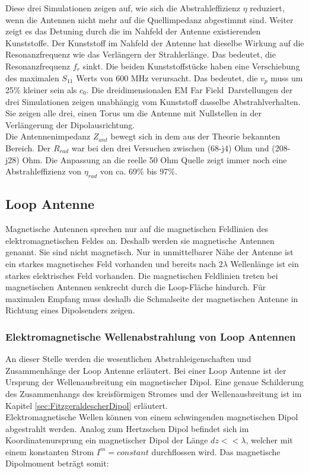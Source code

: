 Diese drei Simulationen zeigen auf, wie sich die Abstrahleffizienz $\eta$ reduziert, wenn die Antennen nicht mehr auf die Quellimpedanz abgestimmt sind. Weiter zeigt es das Detuning durch die im Nahfeld der Antenne existierenden Kunststoffe. Der Kunststoff im Nahfeld der Antenne hat dieselbe Wirkung auf die Resonanzfrequenz wie das Verlängern der  Strahlerlänge. Das bedeutet, die Resonanzfrequenz $f_{r}$ sinkt.  Die beiden Kunststoffstücke haben eine Verschiebung des maximalen $S_{11}$ Werts von 600 MHz verursacht. Das bedeutet, die $v_p$ muss um 25\% kleiner sein als $c_0$.
Die dreidimensionalen \glqq EM Far Field\grqq \  Darstellungen der drei Simulationen zeigen unabhängig vom Kunststoff dasselbe Abstrahlverhalten. Sie zeigen alle drei, einen Torus um die Antenne mit Nullstellen in der Verlängerung der Dipolausrichtung.\\
Die Antennenimpedanz $Z_{ant}$ bewegt sich in dem aus der Theorie bekannten Bereich. Der $R_{rad}$ war bei den drei Versuchen zwischen (68-j4) Ohm und  (208-j28) Ohm. Die Anpassung an die reelle 50 Ohm Quelle zeigt immer noch eine Abstrahleffizienz von $\eta_{rad}$ von   ca. 69\% bis 97\%.



\subsection{Loop Antenne}
Magnetische Antennen sprechen nur auf die magnetischen Feldlinien des elektromagnetischen Feldes an. Deshalb werden sie magnetische Antennen genannt. Sie sind nicht magnetisch. Nur in unmittelbarer Nähe der Antenne ist ein starkes magnetisches Feld vorhanden und bereits nach $2\lambda$ Wellenlänge ist ein starkes elektrisches Feld vorhanden. Die magnetischen Feldlinien treten bei magnetischen Antennen senkrecht durch die Loop-Fläche hindurch. Für maximalen Empfang muss deshalb die Schmalseite der magnetischen Antenne in Richtung eines Dipolsenders  zeigen.

\subsubsection{Elektromagnetische Wellenabstrahlung von Loop Antennen}
An dieser Stelle werden die wesentlichen Abstrahleigenschaften und Zusammenhänge  der Loop Antenne erläutert.
Bei einer Loop Antenne ist der Ursprung der Wellenausbreitung ein magnetischer Dipol. Eine genaue Schilderung des Zusammenhangs des kreisförmigen Stromes und der Wellenausbreitung ist im Kapitel \ref{sec:FitzgeraldescherDipol} erläutert. \\
Elektromagnetische Wellen können  von einem schwingenden magnetischen Dipol
abgestrahlt werden. Analog zum Hertzschen Dipol befindet sich im Koordinatenursprung
ein magnetischer Dipol der Länge $dz<<\lambda$, welcher mit einem konstanten
Strom $I^{m}=constant$ durchflossen wird. Das magnetische Dipolmoment beträgt somit:

